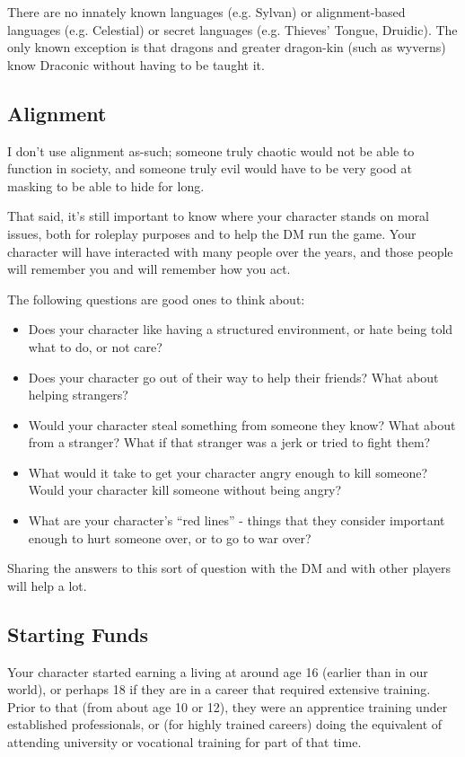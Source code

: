 There are no innately known languages (e.g. Sylvan) or alignment-based
languages (e.g. Celestial) or secret languages (e.g. Thieves' Tongue,
Druidic). The only known exception is that dragons and greater dragon-kin
(such as wyverns) know Draconic without having to be taught it.

%
\subsection{Alignment}

I don't use alignment as-such; someone truly chaotic would not be able to
function in society, and someone truly evil would have to be very good at
masking to be able to hide for long.

That said, it's still important to know where your character stands on
moral issues, both for roleplay purposes and to help the DM run the game.
Your character will have interacted with many people over the years, and
those people will remember you and will remember how you act.

The following questions are good ones to think about:

\begin{itemize}
%
\item Does your character like having a structured environment, or hate
being told what to do, or not care?
%
\item Does your character go out of their way to help their friends? What
about helping strangers?
%
\item Would your character steal something from someone they know? What
about from a stranger? What if that stranger was a jerk or tried to fight
them?
%
\item What would it take to get your character angry enough to kill
someone? Would your character kill someone without being angry?
%
\item What are your character's ``red lines'' - things that they consider
important enough to hurt someone over, or to go to war over?
%
\end{itemize}

Sharing the answers to this sort of question with the DM and with other
players will help a lot.

%
\subsection{Starting Funds}

Your character started earning a living at around age 16 (earlier than in
our world), or perhaps 18 if they are in a career that required extensive
training. Prior to that (from about age 10 or 12), they were an apprentice
training under established professionals, or (for highly trained careers)
doing the equivalent of attending university or vocational training for
part of that time.

